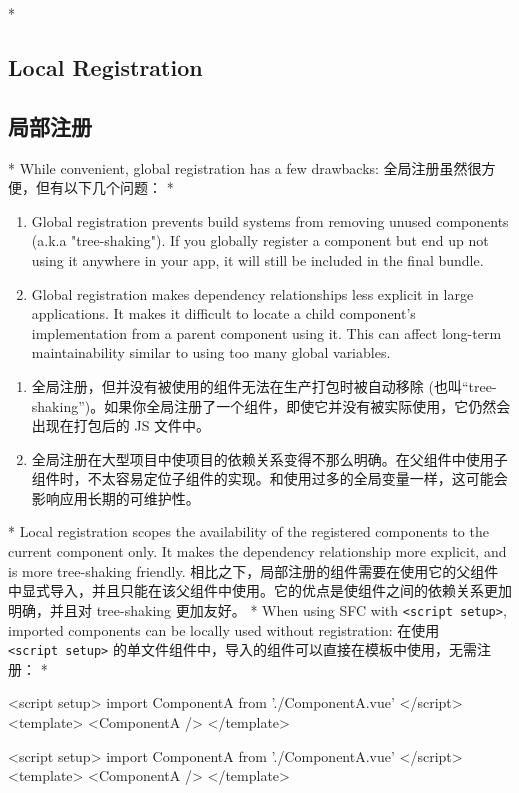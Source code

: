 \begin{paracol}{2}

\switchcolumn[0]*%
\subsection{Local Registration}
\switchcolumn
\subsection{局部注册}
\switchcolumn[0]*%
While convenient, global registration has a few drawbacks:
\switchcolumn
全局注册虽然很方便，但有以下几个问题：
\switchcolumn[0]*%
\begin{enumerate}
\item
    Global registration prevents build systems from removing unused
    components (a.k.a "tree-shaking"). If you globally register a
    component but end up not using it anywhere in your app, it will still
    be included in the final bundle.
\item
    Global registration makes dependency relationships less explicit in
    large applications. It makes it difficult to locate a child
    component's implementation from a parent component using it. This can
    affect long-term maintainability similar to using too many global
    variables.
\end{enumerate}
\switchcolumn
\begin{enumerate}
\item
    全局注册，但并没有被使用的组件无法在生产打包时被自动移除
    (也叫``tree-shaking'')。如果你全局注册了一个组件，即使它并没有被实际使用，它仍然会出现在打包后的
    JS 文件中。
\item
    全局注册在大型项目中使项目的依赖关系变得不那么明确。在父组件中使用子组件时，不太容易定位子组件的实现。和使用过多的全局变量一样，这可能会影响应用长期的可维护性。
\end{enumerate}


\switchcolumn[0]*%
Local registration scopes the availability of the registered components
to the current component only. It makes the dependency relationship more
explicit, and is more tree-shaking friendly.
\switchcolumn
相比之下，局部注册的组件需要在使用它的父组件中显式导入，并且只能在该父组件中使用。它的优点是使组件之间的依赖关系更加明确，并且对
tree-shaking 更加友好。
\switchcolumn[0]*%
When using SFC with \texttt{\textless{}script\ setup\textgreater{}},
imported components can be locally used without registration:
\switchcolumn
在使用 \texttt{\textless{}script\ setup\textgreater{}}
的单文件组件中，导入的组件可以直接在模板中使用，无需注册：
\switchcolumn[0]*%
\begin{codeHtml}
<script setup>
import ComponentA from './ComponentA.vue'
</script>
<template>
  <ComponentA />
</template>
\end{codeHtml}
\switchcolumn
\begin{codeHtml}
<script setup>
import ComponentA from './ComponentA.vue'
</script>
<template>
  <ComponentA />
</template>
\end{codeHtml}



\end{paracol}
